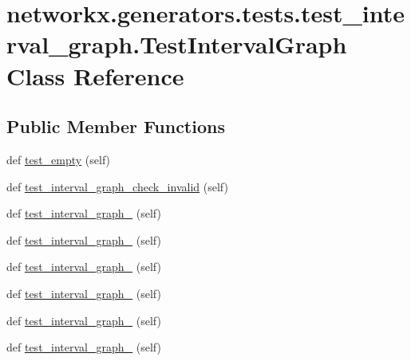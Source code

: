 \hypertarget{classnetworkx_1_1generators_1_1tests_1_1test__interval__graph_1_1TestIntervalGraph}{}\section{networkx.\+generators.\+tests.\+test\+\_\+interval\+\_\+graph.\+Test\+Interval\+Graph Class Reference}
\label{classnetworkx_1_1generators_1_1tests_1_1test__interval__graph_1_1TestIntervalGraph}
\subsection*{Public Member Functions}
\begin{DoxyCompactItemize}
\item 
def \hyperlink{classnetworkx_1_1generators_1_1tests_1_1test__interval__graph_1_1TestIntervalGraph_a637f8f1e67d288174834cbc19f7550d2}{test\+\_\+empty} (self)
\item 
def \hyperlink{classnetworkx_1_1generators_1_1tests_1_1test__interval__graph_1_1TestIntervalGraph_a8a7d24365b0a0de23409b7d0c1d12469}{test\+\_\+interval\+\_\+graph\+\_\+check\+\_\+invalid} (self)
\item 
def \hyperlink{classnetworkx_1_1generators_1_1tests_1_1test__interval__graph_1_1TestIntervalGraph_a0f4d3fcea9d2f158d1c9abce823a568b}{test\+\_\+interval\+\_\+graph\+\_} (self)
\item 
def \hyperlink{classnetworkx_1_1generators_1_1tests_1_1test__interval__graph_1_1TestIntervalGraph_a5e436e7438b37709e95e62c4b61b4bd5}{test\+\_\+interval\+\_\+graph\+\_} (self)
\item 
def \hyperlink{classnetworkx_1_1generators_1_1tests_1_1test__interval__graph_1_1TestIntervalGraph_a9d831067ad1b447be09e24ebbb81a832}{test\+\_\+interval\+\_\+graph\+\_} (self)
\item 
def \hyperlink{classnetworkx_1_1generators_1_1tests_1_1test__interval__graph_1_1TestIntervalGraph_a3b9cf7f7d637ca85a843d9fc9c378564}{test\+\_\+interval\+\_\+graph\+\_} (self)
\item 
def \hyperlink{classnetworkx_1_1generators_1_1tests_1_1test__interval__graph_1_1TestIntervalGraph_ade296f661dc96365992103f28df89b8d}{test\+\_\+interval\+\_\+graph\+\_} (self)
\item 
def \hyperlink{classnetworkx_1_1generators_1_1tests_1_1test__interval__graph_1_1TestIntervalGraph_a79d92503c707e09c711c5baaaee9c161}{test\+\_\+interval\+\_\+graph\+\_} (self)
\end{DoxyCompactItemize}


